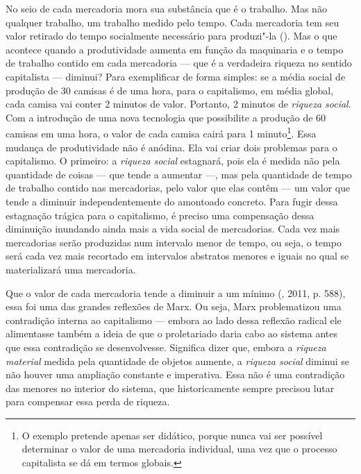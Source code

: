 No seio de cada mercadoria mora sua substância que é o trabalho. Mas não
qualquer trabalho, um trabalho medido pelo tempo. Cada mercadoria tem
seu valor retirado do tempo socialmente necessário para produzi"-la
(). Mas o que acontece quando a produtividade aumenta em
função da maquinaria e o tempo de trabalho contido em cada mercadoria
--- que é a verdadeira riqueza no sentido capitalista --- diminui? Para
exemplificar de forma simples: se a média social de produção de 30
camisas é de uma hora, para o capitalismo, em média global, cada camisa
vai conter 2 minutos de valor. Portanto, 2 minutos de \emph{riqueza
social}. Com a introdução de uma nova tecnologia que possibilite a
produção de 60 camisas em uma hora, o valor de cada camisa cairá para 1
minuto\footnote{O exemplo pretende apenas ser didático, porque nunca vai
  ser possível determinar o valor de uma mercadoria individual, uma vez
  que o processo capitalista se dá em termos globais.}. Essa mudança de
produtividade não é anódina. Ela vai criar dois problemas para o
capitalismo. O primeiro: a \emph{riqueza social} estagnará, pois ela é
medida não pela quantidade de coisas --- que tende a aumentar ---, mas
pela quantidade de tempo de trabalho contido nas mercadorias, pelo valor
que elas contêm --- um valor que tende a diminuir independentemente do
amontoado concreto. Para fugir dessa estagnação trágica para o
capitalismo, é preciso uma compensação dessa diminuição inundando ainda
mais a vida social de mercadorias. Cada vez mais mercadorias serão
produzidas num intervalo menor de tempo, ou seja, o tempo será cada vez
mais recortado em intervalos abstratos menores e iguais no qual se
materializará uma mercadoria.

Que o valor de cada mercadoria tende a diminuir a um mínimo (, 2011,
p. 588), essa foi uma das grandes reflexões de Marx. Ou seja, Marx
problematizou uma contradição interna ao capitalismo --- embora ao lado
dessa reflexão radical ele alimentasse também a ideia de que o
proletariado daria cabo ao sistema antes que essa contradição se
desenvolvesse. Significa dizer que, embora a \emph{riqueza material}
medida pela quantidade de objetos aumente, a \emph{riqueza social}
diminui se não houver uma ampliação constante e imperativa. Essa não é
uma contradição das menores no interior do sistema, que historicamente
sempre precisou lutar para compensar essa perda de riqueza.

